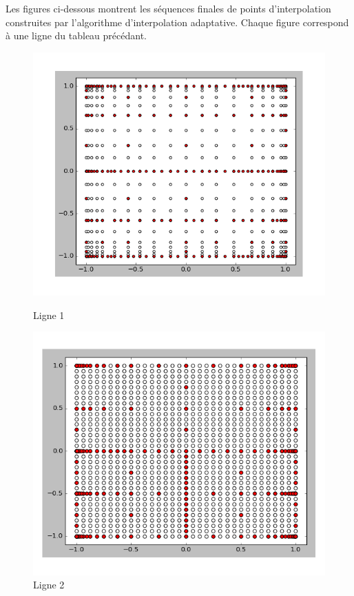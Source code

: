 Les figures ci-dessous montrent les séquences finales de points d'interpolation construites par l'algorithme d'interpolation adaptative.
Chaque figure correspond à une ligne du tableau précédant.
\begin{figure}[h]
   \begin{minipage}[b]{0.5\linewidth}
      \centering \includegraphics[scale=0.3]{images/0.png}
			\caption{Ligne 1}
   \end{minipage}
   \begin{minipage}[b]{0.5\linewidth}
      \centering \includegraphics[scale=0.3]{images/2.png}
			\caption{Ligne 2}
   \end{minipage}
\end{figure}

